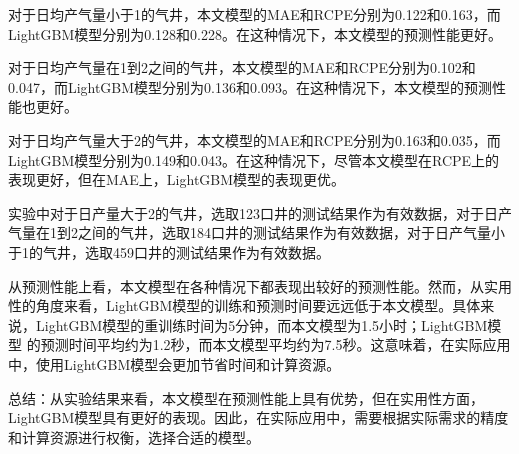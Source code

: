 对于日均产气量小于1的气井，本文模型的MAE和RCPE分别为0.122和0.163，而LightGBM模型分别为0.128和0.228。在这种情况下，本文模型的预测性能更好。

对于日均产气量在1到2之间的气井，本文模型的MAE和RCPE分别为0.102和0.047，而LightGBM模型分别为0.136和0.093。在这种情况下，本文模型的预测性能也更好。

对于日均产气量大于2的气井，本文模型的MAE和RCPE分别为0.163和0.035，而LightGBM模型分别为0.149和0.043。在这种情况下，尽管本文模型在RCPE上的表现更好，但在MAE上，LightGBM模型的表现更优。

实验中对于日产量大于2的气井，选取123口井的测试结果作为有效数据，对于日产气量在1到2之间的气井，选取184口井的测试结果作为有效数据，对于日产气量小于1的气井，选取459口井的测试结果作为有效数据。

从预测性能上看，本文模型在各种情况下都表现出较好的预测性能。然而，从实用性的角度来看，LightGBM模型的训练和预测时间要远远低于本文模型。具体来说，LightGBM模型的重训练时间为5分钟，而本文模型为1.5小时；LightGBM模型
的预测时间平均约为1.2秒，而本文模型平均约为7.5秒。这意味着，在实际应用中，使用LightGBM模型会更加节省时间和计算资源。

总结：从实验结果来看，本文模型在预测性能上具有优势，但在实用性方面，LightGBM模型具有更好的表现。因此，在实际应用中，需要根据实际需求的精度和计算资源进行权衡，选择合适的模型。
